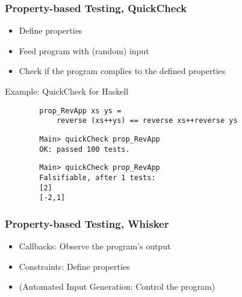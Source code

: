\begin{frame}
\end{frame}

\begin{frame}[fragile]\frametitle{Property-based Testing, QuickCheck}
    \begin{itemize}
        \item Define properties
        \item Feed program with (random) input
        \item Check if the program complies to the defined properties
    \end{itemize}

    \bigskip

    Example: QuickCheck for Haskell

    \begin{verbatim}
        prop_RevApp xs ys =
            reverse (xs++ys) == reverse xs++reverse ys
    \end{verbatim}

    \begin{verbatim}
        Main> quickCheck prop_RevApp
        OK: passed 100 tests.
    \end{verbatim}

    \begin{verbatim}
        Main> quickCheck prop_RevApp
        Falsifiable, after 1 tests:
        [2]
        [-2,1]
    \end{verbatim}
\end{frame}

\begin{frame}\frametitle{Property-based Testing, Whisker}
    \begin{itemize}
        \item \textcolor{upfim}{Callbacks:} Observe the program's output
        \item \textcolor{upfim}{Constraints}: Define properties
        \item (\textcolor{upfim}{Automated Input Generation}: Control the program)
    \end{itemize}
\end{frame}

